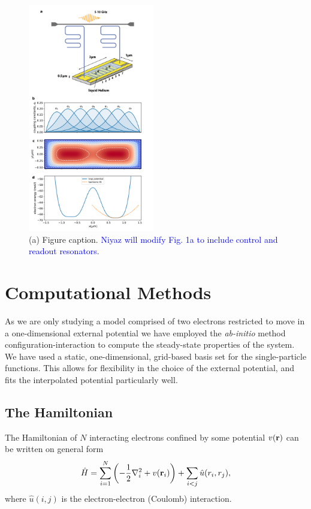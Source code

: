 \documentclass[twocolumn,superscriptaddress,unsortedaddress,
 amsmath,amssymb,
 aps,
]{revtex4-2}
\begin{document}
\begin{figure}
\includegraphics[width=0.49\textwidth]{figure1_1.png}
\caption{\label{fig3} (a) Figure caption. \textcolor{blue}{Niyaz will modify Fig. 1a to include control and readout resonators.}}
\end{figure}

\section{Computational Methods} %
    As we are only studying a model comprised of two electrons restricted to move in a
    one-dimensional external potential we have employed the
    \emph{ab-initio} method configuration-interaction to compute the steady-state
    properties of the system.
    We have used a static, one-dimensional, grid-based basis set for the single-particle
    functions.
    This allows for flexibility in the choice of the external potential, and fits the
    interpolated potential particularly well.
    
    \subsection{The Hamiltonian}
    The Hamiltonian of $N$ interacting electrons confined by some potential $v(\vb{r})$ can be written on general form 
    \begin{equation}
        \hat{H} = \sum_{i=1}^N \left(-\frac{1}{2}\nabla_i^2 + v(\vb{r}_i) \right) + \sum_{i < j} \hat{u}(r_i, r_j),
    \end{equation}
    where $\hat{u}(i,j)$ is the electron-electron (Coulomb) interaction. 
    
\end{document}
